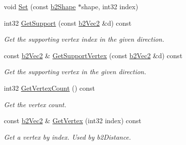 \begin{DoxyCompactItemize}
void \hyperlink{structb2DistanceProxy_a80a59a9c9e952482a8fc6db4b883365d}{Set} (const \hyperlink{classb2Shape}{b2\+Shape} $\ast$shape, int32 index)
\item 
\mbox{\label{structb2DistanceProxy_a39de286cc0c1e829adfacfa0061b04f2}} 
int32 \hyperlink{structb2DistanceProxy_a39de286cc0c1e829adfacfa0061b04f2}{Get\+Support} (const \hyperlink{structb2Vec2}{b2\+Vec2} \&d) const
\begin{DoxyCompactList}\small\item\em Get the supporting vertex index in the given direction. \end{DoxyCompactList}\item 
\mbox{\label{structb2DistanceProxy_a62ab58a28b71fbadd56213e8c43a2a73}} 
const \hyperlink{structb2Vec2}{b2\+Vec2} \& \hyperlink{structb2DistanceProxy_a62ab58a28b71fbadd56213e8c43a2a73}{Get\+Support\+Vertex} (const \hyperlink{structb2Vec2}{b2\+Vec2} \&d) const
\begin{DoxyCompactList}\small\item\em Get the supporting vertex in the given direction. \end{DoxyCompactList}\item 
\mbox{\label{structb2DistanceProxy_a99c461f28d484429dac8f14b58f63d89}} 
int32 \hyperlink{structb2DistanceProxy_a99c461f28d484429dac8f14b58f63d89}{Get\+Vertex\+Count} () const
\begin{DoxyCompactList}\small\item\em Get the vertex count. \end{DoxyCompactList}\item 
\mbox{\label{structb2DistanceProxy_aaa521464467cc034771e09b35ff8f96b}} 
const \hyperlink{structb2Vec2}{b2\+Vec2} \& \hyperlink{structb2DistanceProxy_aaa521464467cc034771e09b35ff8f96b}{Get\+Vertex} (int32 index) const
\begin{DoxyCompactList}\small\item\em Get a vertex by index. Used by b2\+Distance. \end{DoxyCompactList}\end{DoxyCompactItemize}

